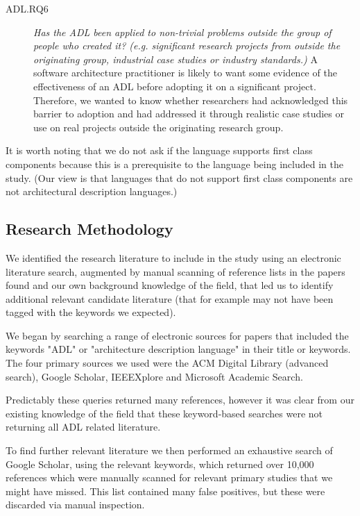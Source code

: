 \begin{description}
\item[ADL.RQ6] \emph{Has the ADL been applied to non-trivial problems outside the group of people who created it? (e.g. significant research projects from outside the originating group, industrial case studies or industry standards.)}  A software architecture practitioner is likely to want some evidence of the effectiveness of an ADL before adopting it on a significant project.  Therefore, we wanted to know whether researchers had acknowledged this barrier to adoption and had addressed it through realistic case studies or use on real projects outside the originating research group.

\end{description}

It is worth noting that we do not ask if the language supports first class components because this is a prerequisite to the language being included in the study.  (Our view is that languages that do not support first class components are not architectural description languages.) 

\subsection{Research Methodology}

We identified the research literature to include in the study using an electronic literature search, augmented by manual scanning of reference lists in the papers found and our own background knowledge of the field, that led us to identify additional relevant candidate literature (that for example may not have been tagged with the keywords we expected).

We began by searching a range of electronic sources for papers that included the keywords "ADL" or "architecture description language" in their title or keywords.  The four primary sources we used were the ACM Digital Library (advanced search), Google Scholar, IEEEXplore and Microsoft Academic Search.

Predictably these queries returned many references, however it was clear from our existing knowledge of the field that these keyword-based searches were not returning all ADL related literature. 

To find further relevant literature we then performed an exhaustive search of Google Scholar, using the relevant keywords, which returned over 10,000 references which were manually scanned for relevant primary studies that we might have missed.  This list contained many false positives, but these were discarded via manual inspection. 

